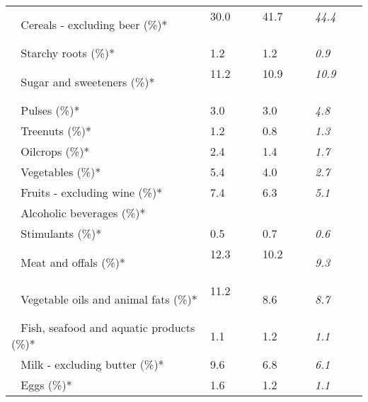 \begin{tabular}{L{3.9cm} R{1cm} R{1cm} R{1cm}}
	 ~ Cereals - excluding beer (\%)* & 30.0 ~ \ \ & 41.7 ~ \ \ & \textit{44.4} ~ \ \ \\ 
	 ~ Starchy roots (\%)* & 1.2 ~ \ \ & 1.2 ~ \ \ & \textit{0.9} ~ \ \ \\ 
	 ~ Sugar and sweeteners (\%)* & 11.2 ~ \ \ & 10.9 ~ \ \ & \textit{10.9} ~ \ \ \\ 
	 ~ Pulses (\%)* & 3.0 ~ \ \ & 3.0 ~ \ \ & \textit{4.8} ~ \ \ \\ 
	 ~ Treenuts (\%)* & 1.2 ~ \ \ & 0.8 ~ \ \ & \textit{1.3} ~ \ \ \\ 
	 ~ Oilcrops (\%)* & 2.4 ~ \ \ & 1.4 ~ \ \ & \textit{1.7} ~ \ \ \\ 
	 ~ Vegetables (\%)* & 5.4 ~ \ \ & 4.0 ~ \ \ & \textit{2.7} ~ \ \ \\ 
	 ~ Fruits - excluding wine (\%)* & 7.4 ~ \ \ & 6.3 ~ \ \ & \textit{5.1} ~ \ \ \\ 
	 ~ Alcoholic beverages (\%)* &  ~ \ \ &  ~ \ \ &  ~ \ \ \\ 
	 ~ Stimulants (\%)* & 0.5 ~ \ \ & 0.7 ~ \ \ & \textit{0.6} ~ \ \ \\ 
	 ~ Meat and offals (\%)* & 12.3 ~ \ \ & 10.2 ~ \ \ & \textit{9.3} ~ \ \ \\ 
	 ~ Vegetable oils and animal fats (\%)* & 11.2 ~ \ \ & 8.6 ~ \ \ & \textit{8.7} ~ \ \ \\ 
	 ~ Fish, seafood and aquatic products (\%)* & 1.1 ~ \ \ & 1.2 ~ \ \ & \textit{1.1} ~ \ \ \\ 
	 ~ Milk - excluding butter (\%)* & 9.6 ~ \ \ & 6.8 ~ \ \ & \textit{6.1} ~ \ \ \\ 
	 ~ Eggs (\%)* & 1.6 ~ \ \ & 1.2 ~ \ \ & \textit{1.1} ~ \ \ \\ 
       \toprule
      \end{tabular}
      \clearpage
{}
